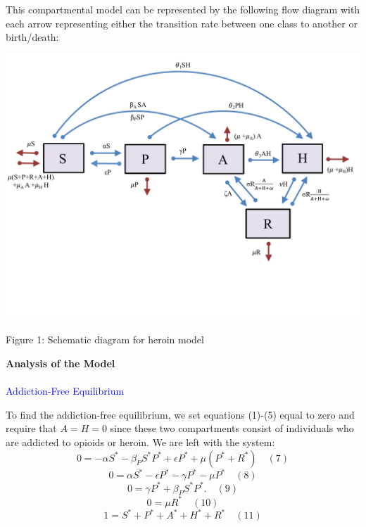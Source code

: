 \documentclass[12pt]{article}
\begin{document}
This compartmental model can be represented by the following flow diagram with each arrow representing either the transition rate between one class to another or birth/death: 

\includegraphics[scale=0.6]{heroin_schematic.pdf}
\vspace{-0.8cm}
\begin{center}
Figure 1: Schematic diagram for heroin model
\end{center}



\textbf{Analysis of the Model} \\ \\

 \textcolor{blue}{Addiction-Free Equilibrium} 

To find the addiction-free equilibrium, we set equations (1)-(5) equal to zero and require that $A=H=0$ since these two compartments consist of individuals who are addicted to opioids or heroin. We are left with the system: \\
\[0=-\alpha S^* -\beta_{P} S^* P^* + \epsilon P^* +\mu (P^* + R^*) \quad (7)\]
\[0=\alpha S^* - \epsilon P^* -\gamma P^* - \mu P^* \quad(8)\]
\[0=\gamma P^* + \beta_{P} S^* P^*.   \quad(9)\]
\[0=\mu R^* \quad(10)\]
\[1=S^*+P^*+A^*+H^*+R^* \quad(11)\]
\end{document}
